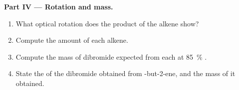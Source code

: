 \begin{problem}
\medskip
\noindent\textbf{Part IV --- Rotation and mass.}
\begin{enumerate}[resume]
  \item What optical rotation does the product of the  alkene show?
  \item Compute the amount of each alkene.
  \item Compute the mass of dibromide expected from each at
        \qty{85}{\percent} .
  \item State the  of the dibromide obtained from
        -but-2-ene, and the mass of it obtained.
\end{enumerate}
\end{problem}
